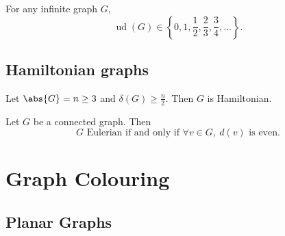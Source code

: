 \documentclass{article}
\DeclareMathOperator{\ud}{ud}
\begin{document}
\begin{ncor}
    For any infinite graph $G$,
    \begin{equation*}
        \ud(G) \in \left\{0, 1, \frac{1}{2}, \frac{2}{3}, \frac{3}{4}, \dotsc\right\}.
    \end{equation*}
\end{ncor}





















\subsection{Hamiltonian graphs}









\begin{nthm}\label{thm:17}
    Let $\abs{G} = n \geq 3$ and $\delta(G) \geq \frac{n}{2}$. Then $G$ is Hamiltonian.
\end{nthm}









\begin{nprop}\label{thm:18}
    Let $G$ be a connected graph. Then
    \begin{equation*}
        G\text{ Eulerian if and only if } \forall v \in G,\ d(v)\text{ is even.}
    \end{equation*}
\end{nprop}

\clearpage
\section{Graph Colouring}







\subsection{Planar Graphs}
\end{document}
